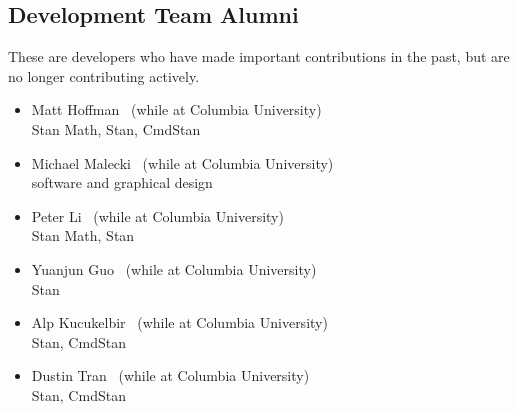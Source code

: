\subsection*{Development Team Alumni}

These are developers who have made important contributions in the
past, but are no longer contributing actively.

\begin{itemize}
\item Matt Hoffman \ (while at Columbia University)
\\ {\footnotesize Stan Math, Stan, CmdStan}
\item Michael Malecki \ (while at Columbia University)
\\ {\footnotesize software and graphical design}
\item Peter Li \   (while at Columbia University)
\\ {\footnotesize Stan Math, Stan}
\item Yuanjun Guo \ (while at Columbia University)
\\ {\footnotesize Stan}
\item Alp Kucukelbir \ (while at Columbia University)
\\ {\footnotesize Stan, CmdStan}
\item Dustin Tran \ (while at Columbia University)
\\ {\footnotesize Stan, CmdStan}
\end{itemize}
